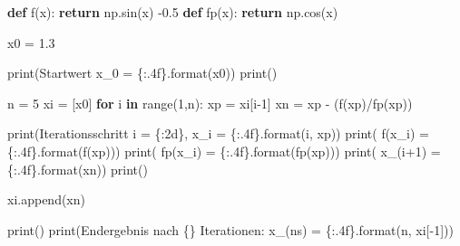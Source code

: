 \documentclass[
  letterpaper,
  DIV=11,
  numbers=noendperiod]{scrreprt}
\newenvironment{Shaded}{\begin{snugshade}}{\end{snugshade}}
\newcommand{\BuiltInTok}[1]{\textcolor[rgb]{0.00,0.23,0.31}{#1}}
\newcommand{\ControlFlowTok}[1]{\textcolor[rgb]{0.00,0.23,0.31}{\textbf{#1}}}
\newcommand{\DecValTok}[1]{\textcolor[rgb]{0.68,0.00,0.00}{#1}}
\newcommand{\FloatTok}[1]{\textcolor[rgb]{0.68,0.00,0.00}{#1}}
\newcommand{\KeywordTok}[1]{\textcolor[rgb]{0.00,0.23,0.31}{\textbf{#1}}}
\newcommand{\NormalTok}[1]{\textcolor[rgb]{0.00,0.23,0.31}{#1}}
\newcommand{\OperatorTok}[1]{\textcolor[rgb]{0.37,0.37,0.37}{#1}}
\newcommand{\SpecialCharTok}[1]{\textcolor[rgb]{0.37,0.37,0.37}{#1}}
\newcommand{\StringTok}[1]{\textcolor[rgb]{0.13,0.47,0.30}{#1}}
\begin{document}
\begin{Shaded}
\begin{Highlighting}[]
\KeywordTok{def}\NormalTok{ f(x):}
    \ControlFlowTok{return}\NormalTok{ np.sin(x) }\OperatorTok{{-}}\FloatTok{0.5}
\KeywordTok{def}\NormalTok{ fp(x):}
    \ControlFlowTok{return}\NormalTok{ np.cos(x)}

\NormalTok{x0 }\OperatorTok{=} \FloatTok{1.3}

\BuiltInTok{print}\NormalTok{(}\StringTok{\textquotesingle{}Startwert x\_0 = }\SpecialCharTok{\{:.4f\}}\StringTok{\textquotesingle{}}\NormalTok{.}\BuiltInTok{format}\NormalTok{(x0))}
\BuiltInTok{print}\NormalTok{()}

\NormalTok{n }\OperatorTok{=} \DecValTok{5}
\NormalTok{xi }\OperatorTok{=}\NormalTok{ [x0]}
\ControlFlowTok{for}\NormalTok{ i }\KeywordTok{in} \BuiltInTok{range}\NormalTok{(}\DecValTok{1}\NormalTok{,n):}
\NormalTok{    xp }\OperatorTok{=}\NormalTok{ xi[i}\OperatorTok{{-}}\DecValTok{1}\NormalTok{]}
\NormalTok{    xn }\OperatorTok{=}\NormalTok{ xp }\OperatorTok{{-}}\NormalTok{ (f(xp)}\OperatorTok{/}\NormalTok{fp(xp))}
    
    \BuiltInTok{print}\NormalTok{(}\StringTok{\textquotesingle{}Iterationsschritt i = }\SpecialCharTok{\{:2d\}}\StringTok{, x\_i = }\SpecialCharTok{\{:.4f\}}\StringTok{\textquotesingle{}}\NormalTok{.}\BuiltInTok{format}\NormalTok{(i, xp))}
    \BuiltInTok{print}\NormalTok{(}\StringTok{\textquotesingle{}   f(x\_i)  = }\SpecialCharTok{\{:.4f\}}\StringTok{\textquotesingle{}}\NormalTok{.}\BuiltInTok{format}\NormalTok{(f(xp)))}
    \BuiltInTok{print}\NormalTok{(}\StringTok{\textquotesingle{}   fp(x\_i) = }\SpecialCharTok{\{:.4f\}}\StringTok{\textquotesingle{}}\NormalTok{.}\BuiltInTok{format}\NormalTok{(fp(xp)))}
    \BuiltInTok{print}\NormalTok{(}\StringTok{\textquotesingle{}   x\_(i+1) = }\SpecialCharTok{\{:.4f\}}\StringTok{\textquotesingle{}}\NormalTok{.}\BuiltInTok{format}\NormalTok{(xn))}
    \BuiltInTok{print}\NormalTok{()}
    
\NormalTok{    xi.append(xn)}
    
\BuiltInTok{print}\NormalTok{()}
\BuiltInTok{print}\NormalTok{(}\StringTok{\textquotesingle{}Endergebnis nach }\SpecialCharTok{\{\}}\StringTok{ Iterationen: x\_(ns) = }\SpecialCharTok{\{:.4f\}}\StringTok{\textquotesingle{}}\NormalTok{.}\BuiltInTok{format}\NormalTok{(n, xi[}\OperatorTok{{-}}\DecValTok{1}\NormalTok{]))}
\end{Highlighting}
\end{Shaded}
\end{document}
